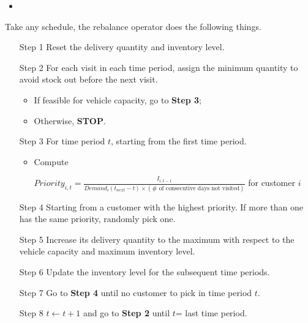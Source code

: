 \documentclass{article}
\begin{document}
\begin{itemize}
    \item 
\end{itemize}

\newpage

Take any schedule, the rebalance operator does the following things.
\begin{itemize} 
    \item [Step 1] Reset the delivery quantity and inventory level.
    \item [Step 2] For each visit in each time period, assign the minimum quantity to avoid stock out before the next visit. 
                   \begin{itemize}
                        \item If feasible for vehicle capacity, go to \textbf{Step 3};
                        \item Otherwise, \textbf{STOP}.
                   \end{itemize}
    \item [Step 3] For time period $t$, starting from the first time period.
            \begin{itemize}
            \item Compute 
            
            $Priority_{i,t} = \frac{I_{i,t-1}}{Demand_i(t_{next} - t)\times (\#\mbox{ of consecutive days not visited})}$ for customer $i$
            
        \end{itemize} 
    \item [Step 4] Starting from a customer with the highest priority. If more than one has the same priority, randomly pick one.
    \item [Step 5] Increase its delivery quantity to the maximum with respect to the vehicle capacity and maximum inventory level.
    \item [Step 6] Update the inventory level for the subsequent time periods.
    \item [Step 7] Go to \textbf{Step 4} until no customer to pick in time period $t$.
    \item [Step 8] $t\gets t+1$ and go to \textbf{Step 2} until $t$= last time period.
\end{itemize} 


\newpage 
\end{document}
